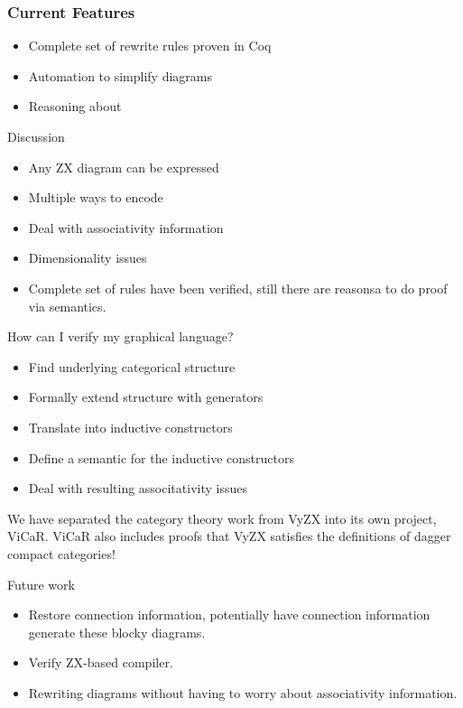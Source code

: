 \documentclass{beamer}
\begin{document}
\begin{frame}
  \frametitle{Current Features}

  \begin{itemize}
    \item Complete set of rewrite rules proven in Coq
    \item Automation to simplify diagrams
    \item Reasoning about 
  \end{itemize}

\end{frame}

\begin{frame}{Discussion}
    \begin{itemize}
        \item Any ZX diagram can be expressed
        \item Multiple ways to encode
        \item Deal with associativity information
        \item Dimensionality issues
        \item Complete set of rules have been verified, still there are reasonsa to do proof via semantics.
    \end{itemize}
\end{frame}

\begin{frame}{How can I verify my graphical language?}
    \begin{itemize}
        \item Find underlying categorical structure 
        \item Formally extend structure with generators
        \item Translate into inductive constructors
        \item Define a semantic for the inductive constructors
        \item Deal with resulting associtativity issues
    \end{itemize}

    \pause 

    We have separated the category theory work from VyZX into its own project, ViCaR. ViCaR also includes proofs that VyZX satisfies the definitions of dagger compact categories!

\end{frame}

\begin{frame}{Future work}
    \begin{itemize}
        \item Restore connection information, potentially have connection information generate these blocky diagrams.
        \item Verify ZX-based compiler.
        \item Rewriting diagrams without having to worry about associativity information.
    \end{itemize}
\end{frame}
\end{document}
